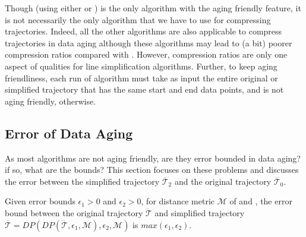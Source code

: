 {Though \dpa (using either \ped or \sed) is the only algorithm with the aging friendly feature, it is not necessarily the only algorithm that we have to use for compressing trajectories. Indeed, all the other algorithms are also applicable to compress trajectories in data aging although these algorithms may lead to (a bit) poorer compression ratios compared with \dpa. However, compression ratios are only one aspect of qualities for line simplification algorithms. Further, to keep aging friendliness, each run of algorithm \dpa must take as input the entire original or simplified trajectory that has the same start and end data points, and is not aging friendly, otherwise.}


\subsection{{Error} of Data Aging}
\label{sec-aging-safe}
As most algorithms are not aging friendly, are they error bounded in data aging?
if so, what are the bounds?
This section focuses on these problems and discusses the error between the simplified trajectory $\overline{\mathcal{T}}_2$ and the original trajectory $\dddot{\mathcal{T}_0}$.



\begin{proposition}
	\label{theo-aging-error-dp}
	Given error bounds $\epsilon_1>0$ and $\epsilon_2>0$, for distance metric $\mathcal{M}$ of \ped and \sed, the error bound between the original trajectory $\dddot{\mathcal{T}}$ and simplified trajectory $\overline{\mathcal{T}}=DP(DP(\dddot{\mathcal{T}}, \epsilon_1, \mathcal{M}), \epsilon_2, \mathcal{M})$ is $max(\epsilon_1, \epsilon_2)$.
\end{proposition}

